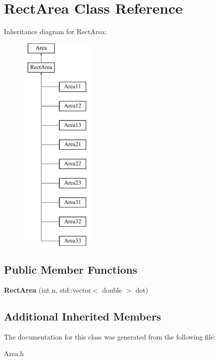 \hypertarget{class_rect_area}{}\section{Rect\+Area Class Reference}
\label{class_rect_area}
Inheritance diagram for Rect\+Area\+:\begin{figure}[H]
\begin{center}
\leavevmode
\includegraphics[height=11.000000cm]{class_rect_area}
\end{center}
\end{figure}
\subsection*{Public Member Functions}
\begin{DoxyCompactItemize}
\item 
\mbox{\label{class_rect_area_adf9ff960f6184aa6dabec01e78a0d4d4}} 
{\bfseries Rect\+Area} (int n, std\+::vector$<$ double $>$ dot)
\end{DoxyCompactItemize}
\subsection*{Additional Inherited Members}


The documentation for this class was generated from the following file\+:\begin{DoxyCompactItemize}
\item 
Area.\+h\end{DoxyCompactItemize}
